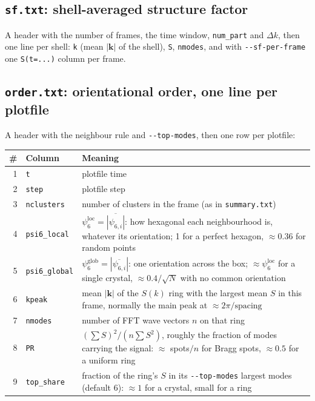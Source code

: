 \documentclass[11pt]{article}
\newcommand{\code}[1]{\texttt{#1}}
\begin{document}
\subsection*{\texorpdfstring{\code{sf.txt}: shell-averaged structure factor}{sf.txt}}
A header with the number of frames, the time window, \code{num\_part} and
$\Delta k$, then one line per shell: \code{k} (mean $|\mathbf k|$ of the
shell), \code{S}, \code{nmodes}, and with \code{-{}-sf-per-frame} one
\code{S(t=...)} column per frame.

\subsection*{\texorpdfstring{\code{order.txt}: orientational order, one line per plotfile}{order.txt}}
A header with the neighbour rule and \code{-{}-top-modes}, then one row per
plotfile:
\begin{center}
\begin{tabularx}{\textwidth}{@{}r l L@{}}
\toprule
\# & Column & Meaning \\
 & \code{t} & plotfile time \\
2 & \code{step} & plotfile step \\
3 & \code{nclusters} & number of clusters in the frame (as in \code{summary.txt}) \\
4 & \code{psi6\_local} & $\psi_6^{\mathrm{loc}}=\overline{|\psi_{6,i}|}$: how hexagonal each neighbourhood is, whatever its orientation; 1 for a perfect hexagon, $\approx0.36$ for random points \\
5 & \code{psi6\_global} & $\psi_6^{\mathrm{glob}}=|\overline{\psi_{6,i}}|$: one orientation across the box; $\approx\psi_6^{\mathrm{loc}}$ for a single crystal, $\approx0.4/\sqrt N$ with no common orientation \\
6 & \code{kpeak} & mean $|\mathbf k|$ of the $S(k)$ ring with the largest mean $S$ in this frame, normally the main peak at $\approx2\pi/\text{spacing}$ \\
7 & \code{nmodes} & number of FFT wave vectors $n$ on that ring \\
8 & \code{PR} & $(\sum S)^2/(n\sum S^2)$, roughly the fraction of modes carrying the signal: $\approx$ spots$/n$ for Bragg spots, $\approx0.5$ for a uniform ring \\
9 & \code{top\_share} & fraction of the ring's $S$ in its \code{-{}-top-modes} largest modes (default 6): $\approx1$ for a crystal, small for a ring \\
\bottomrule
\end{tabularx}
\end{center}
\end{document}
